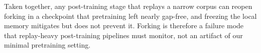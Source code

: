 Taken together, any post-training stage that replays a narrow corpus can reopen forking in a checkpoint that pretraining left nearly gap-free, and freezing the local memory mitigates but does not prevent it. Forking is therefore a failure mode that replay-heavy post-training pipelines must monitor, not an artifact of our minimal pretraining setting.
